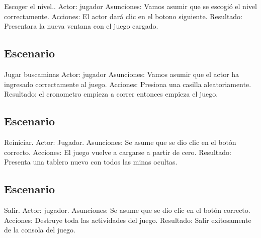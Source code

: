 Escoger el nivel..\newline\newline
Actor: jugador
Asunciones: Vamos asumir que se escogió el nivel correctamente.\newline
Acciones: El actor dará clic en el botono siguiente.\newline
Resultado: Presentara la nueva ventana con el juego cargado.\newline

\subsection{Escenario}
Jugar buscaminas\newline \newline
Actor: jugador\newline
Asunciones: Vamos asumir que el actor ha ingresado correctamente al juego.\newline
Acciones: Presiona una casilla aleatoriamente.\newline
Resultado: el cronometro empieza a correr entonces empieza el juego.\newline

\subsection{Escenario}
Reiniciar.\newline \newline
Actor: Jugador. \newline
Asunciones: Se asume que se dio clic en el botón correcto.\newline
Acciones: El  juego vuelve a cargarse a partir de cero.\newline
Resultado: Presenta una tablero nuevo con todos las minas ocultas.\newline

\subsection{Escenario}
Salir.\newline \newline
Actor: jugador.\newline
Asunciones: Se asume que se dio clic en el botón  correcto.\newline
Acciones: Destruye toda las actividades del juego.\newline
Resultado: Salir exitosamente  de la consola del juego.\newline
\newpage


